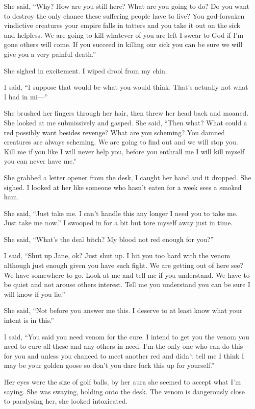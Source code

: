 She said, ``Why? How are you still here? What are you going to do? Do you want to destroy the only chance these suffering people have to live? You god-forsaken vindictive creatures your empire falls in tatters and you take it out on the sick and helpless. We are going to kill whatever of you are left I swear to God if I'm gone others will come. If you succeed in killing our sick you can be sure we will give you a very painful death.''

She sighed in excitement. I wiped drool from my chin.

I said, ``I suppose that would be what you would think. That's actually not what I had in mi---''

She brushed her fingers through her hair, then threw her head back and moaned. She looked at me submissively and gasped. She said, ``Then what? What could a red possibly want besides revenge? What are you scheming? You damned creatures are always scheming. We are going to find out and we will stop you. Kill me if you like I will never help you, before you enthrall me I will kill myself you can never have me.''

She grabbed a letter opener from the desk, I caught her hand and it dropped. She sighed. I looked at her like someone who hasn't eaten for a week sees a smoked ham.

She said, ``Just take me. I can't handle this any longer I need you to take me. Just take me now.'' I swooped in for a bit but tore myself away just in time.

She said, ``What's the deal bitch? My blood not red enough for you?''

I said, ``Shut up Jane, ok? Just shut up. I hit you too hard with the venom although just enough given you have such fight. We are getting out of here see? We have somewhere to go. Look at me and tell me if you understand. We have to be quiet and not arouse others interest. Tell me you understand you can be sure I will know if you lie.''

She said, ``Not before you answer me this. I deserve to at least know what your intent is in this.''

I said, ``You said you need venom for the cure. I intend to get you the venom you need to cure all these and any others in need. I'm the only one who can do this for you and unless you chanced to meet another red and didn't tell me I think I may be your golden goose so don't you dare fuck this up for yourself.''

Her eyes were the size of golf balls, by her aura she seemed to accept what I'm saying. She was swaying, holding onto the desk. The venom is dangerously close to paralysing her, she looked intoxicated.

